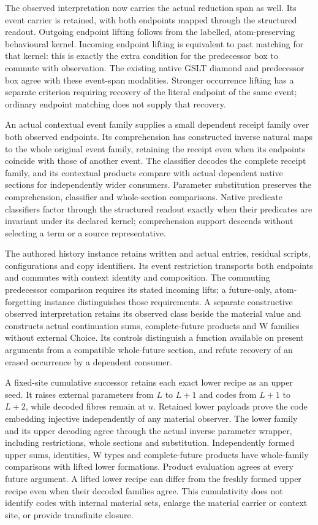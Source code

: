 \documentclass[11pt]{article}
\theoremstyle{definition}
\theoremstyle{remark}
\begin{document}
The observed interpretation now carries the actual reduction span as
well. Its event carrier is retained, with both endpoints mapped through
the structured readout. Outgoing endpoint lifting follows from the
labelled, atom-preserving behavioural kernel. Incoming endpoint lifting
is equivalent to past matching for that kernel: this is exactly the
extra condition for the predecessor box to commute with observation.
The existing native GSLT diamond and predecessor box agree with these
event-span modalities. Stronger occurrence lifting has a separate
criterion requiring recovery of the literal endpoint of the same event;
ordinary endpoint matching does not supply that recovery.

An actual contextual event family supplies a small dependent receipt
family over both observed endpoints. Its comprehension has constructed
inverse natural maps to the whole original event family, retaining the
receipt even when its endpoints coincide with those of another event.
The classifier decodes the complete receipt family, and its contextual
products compare with actual dependent native sections for independently
wider consumers. Parameter substitution preserves the comprehension,
classifier and whole-section comparisons. Native predicate classifiers
factor through the structured readout exactly when their predicates are
invariant under its declared kernel; comprehension support descends
without selecting a term or a source representative.

The authored history instance retains written and actual entries,
residual scripts, configurations and copy identifiers. Its event
restriction transports both endpoints and commutes with context
identity and composition. The commuting predecessor comparison requires
its stated incoming lifts; a future-only, atom-forgetting instance
distinguishes those requirements. A separate constructive observed
interpretation retains its observed class beside the material value and
constructs actual continuation sums, complete-future products and W
families without external Choice. Its controls distinguish a function
available on present arguments from a compatible whole-future section,
and refute recovery of an erased occurrence by a dependent consumer.

A fixed-site cumulative successor retains each exact lower recipe as
an upper seed. It raises external parameters from \(L\) to \(L+1\) and
codes from \(L+1\) to \(L+2\), while decoded fibres remain at \(u\).
Retained lower payloads prove the code embedding injective independently
of any material observer. The lower family and its upper decoding agree
through the actual inverse parameter wrapper, including restrictions,
whole sections and substitution. Independently formed upper sums,
identities, W types and complete-future products have whole-family
comparisons with lifted lower formations. Product evaluation agrees at
every future argument. A lifted lower recipe can differ from the freshly
formed upper recipe even when their decoded families agree. This
cumulativity does not identify codes with internal material sets, enlarge
the material carrier or context site, or provide transfinite closure.
\end{document}
